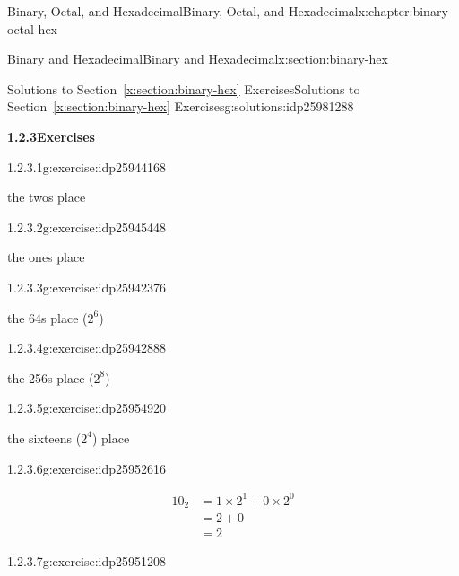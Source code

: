 \documentclass[twoside,10pt,]{book}
\newcommand{\xreffont}{\relax}
\numberwithin{equation}{section}
\newcommand{\amp}{&}
\begin{document}
\begin{chapterptx}{Binary, Octal, and Hexadecimal}{}{Binary, Octal, and Hexadecimal}{}{}{x:chapter:binary-octal-hex}
\begin{sectionptx}{Binary and Hexadecimal}{}{Binary and Hexadecimal}{}{}{x:section:binary-hex}
\begin{solutions-subsection}{Solutions to Section~{\xreffont\ref*{x:section:binary-hex}} Exercises}{}{Solutions to Section~{\xreffont\ref*{x:section:binary-hex}} Exercises}{}{}{g:solutions:idp25981288}
\par\medskip
\noindent\textbf{\normalsize{}1.2.3\space\textperiodcentered\space{}Exercises}
\begin{exercisegroup}
\begin{divisionsolutioneg}{1.2.3.1}{}{g:exercise:idp25944168}%
\par\smallskip%
\noindent\hypertarget{g:solution:idp25944936-main}{}the twos place\end{divisionsolutioneg}%
\begin{divisionsolutioneg}{1.2.3.2}{}{g:exercise:idp25945448}%
\par\smallskip%
\noindent\hypertarget{g:solution:idp25944040-main}{}the ones place\end{divisionsolutioneg}%
\begin{divisionsolutioneg}{1.2.3.3}{}{g:exercise:idp25942376}%
\par\smallskip%
\noindent\hypertarget{g:solution:idp25945704-main}{}the 64s place (\(2^6\))\end{divisionsolutioneg}%
\begin{divisionsolutioneg}{1.2.3.4}{}{g:exercise:idp25942888}%
\par\smallskip%
\noindent\hypertarget{g:solution:idp25948904-main}{}the 256s place (\(2^8\))\end{divisionsolutioneg}%
\begin{divisionsolutioneg}{1.2.3.5}{}{g:exercise:idp25954920}%
\par\smallskip%
\noindent\hypertarget{g:solution:idp25955560-main}{}the sixteens (\(2^4\)) place\end{divisionsolutioneg}%
\end{exercisegroup}
\par\medskip\noindent
\begin{exercisegroup}
\begin{divisionsolutioneg}{1.2.3.6}{}{g:exercise:idp25952616}%
\par\smallskip%
\noindent\hypertarget{g:solution:idp25951848-main}{}%
\begin{align*}
10_2 \amp = 1\times2^1+0\times2^0\\
\amp = 2 + 0\\
\amp = 2
\end{align*}
\end{divisionsolutioneg}%
\begin{divisionsolutioneg}{1.2.3.7}{}{g:exercise:idp25951208}%
\par\smallskip%
\noindent\hypertarget{g:solution:idp25952872-main}{}%

\end{divisionsolutioneg}
\end{exercisegroup}
\end{solutions-subsection}
\end{sectionptx}
\end{chapterptx}
\end{document}
